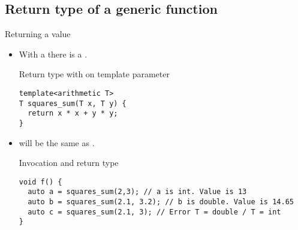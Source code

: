 \subsection{Return type of a generic function}

\begin{frame}[t,fragile]{Returning a value}


\begin{itemize}
  \item With a  
        there is a .

\begin{block}{Return type with on template parameter}
\begin{lstlisting}
template<arithmetic T>
T squares_sum(T x, T y) {
  return x * x + y * y;
}
\end{lstlisting}
\end{block}

  \item {} will be the same as . 

\begin{block}{Invocation and return type}
\begin{lstlisting}
void f() {
  auto a = squares_sum(2,3); // a is int. Value is 13
  auto b = squares_sum(2.1, 3.2); // b is double. Value is 14.65
  auto c = squares_sum(2.1, 3); // Error T = double / T = int
}
\end{lstlisting}
\end{block}

\end{itemize}
\end{frame}

